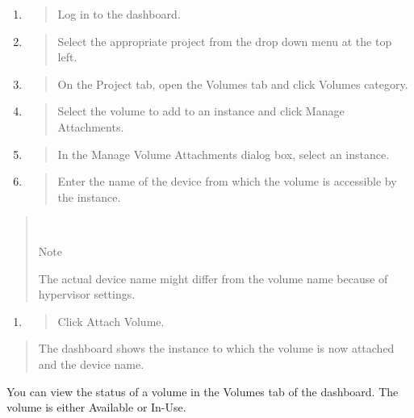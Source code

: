 \begin{enumerate}
\def\labelenumi{\arabic{enumi}.}
\item
  \begin{quote}
  Log in to the dashboard.
  \end{quote}
\item
  \begin{quote}
  Select the appropriate project from the drop down menu at the top
  left.
  \end{quote}
\item
  \begin{quote}
  On the Project tab, open the Volumes tab and click Volumes category.
  \end{quote}
\item
  \begin{quote}
  Select the volume to add to an instance and click Manage Attachments.
  \end{quote}
\item
  \begin{quote}
  In the Manage Volume Attachments dialog box, select an instance.
  \end{quote}
\item
  \begin{quote}
  Enter the name of the device from which the volume is accessible by
  the instance.
  \end{quote}
\end{enumerate}

\begin{quote}
~

Note

The actual device name might differ from the volume name because of
hypervisor settings.
\end{quote}

\begin{enumerate}
\def\labelenumi{\arabic{enumi}.}
\item
  \begin{quote}
  Click Attach Volume.
  \end{quote}
\end{enumerate}

\begin{quote}
The dashboard shows the instance to which the volume is now attached and
the device name.
\end{quote}

You can view the status of a volume in the Volumes tab of the dashboard.
The volume is either Available or In-Use.

